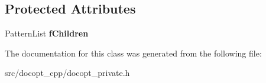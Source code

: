 \subsection*{Protected Attributes}
\begin{DoxyCompactItemize}
\item 
\mbox{\label{classdocopt_1_1BranchPattern_ad34855b839d62d4bfcdfb9cf0b5903cc}} 
Pattern\+List {\bfseries f\+Children}
\end{DoxyCompactItemize}


The documentation for this class was generated from the following file\+:\begin{DoxyCompactItemize}
\item 
src/docopt\+\_\+cpp/docopt\+\_\+private.\+h\end{DoxyCompactItemize}
